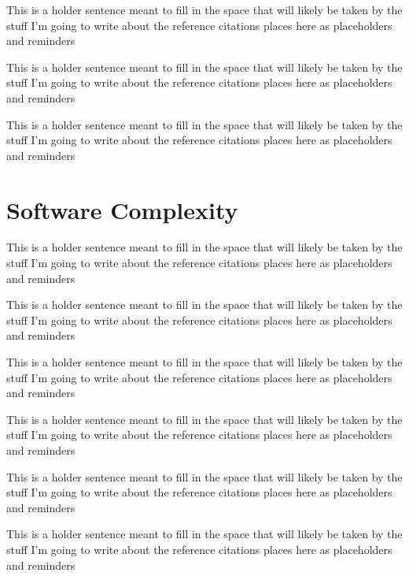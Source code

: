 \cite{simpkins2008towards}

This is a holder sentence meant to fill in the space that will likely be taken by the stuff I'm going to write about the reference citations places here as placeholders and reminders

\cite{zang2007towards}

This is a holder sentence meant to fill in the space that will likely be taken by the stuff I'm going to write about the reference citations places here as placeholders and reminders

\cite{mernik2005when}

This is a holder sentence meant to fill in the space that will likely be taken by the stuff I'm going to write about the reference citations places here as placeholders and reminders

\section{Software Complexity}

This is a holder sentence meant to fill in the space that will likely be taken by the stuff I'm going to write about the reference citations places here as placeholders and reminders

\cite{mccabe1976complexity}

This is a holder sentence meant to fill in the space that will likely be taken by the stuff I'm going to write about the reference citations places here as placeholders and reminders

\cite{gill1991cyclomatic}

This is a holder sentence meant to fill in the space that will likely be taken by the stuff I'm going to write about the reference citations places here as placeholders and reminders

\cite{weyuker1988evaluating}

This is a holder sentence meant to fill in the space that will likely be taken by the stuff I'm going to write about the reference citations places here as placeholders and reminders

\cite{mccabe1989design}

This is a holder sentence meant to fill in the space that will likely be taken by the stuff I'm going to write about the reference citations places here as placeholders and reminders

\cite{kearney1986software}

This is a holder sentence meant to fill in the space that will likely be taken by the stuff I'm going to write about the reference citations places here as placeholders and reminders

